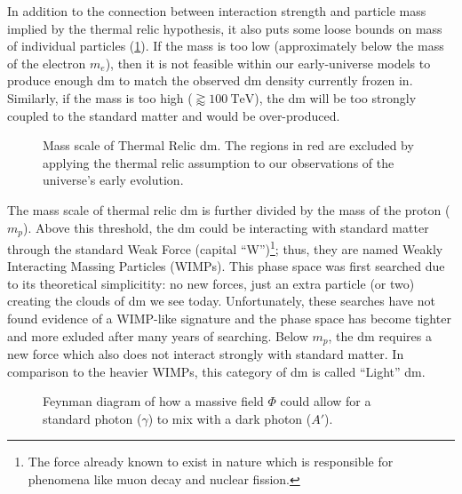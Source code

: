 In addition to the connection between interaction strength and particle mass implied by the thermal
relic hypothesis, it also puts some loose bounds on mass of individual particles
(\cref{fig:dm-mass-scale}). If the mass is too low (approximately below the mass of the electron
$m_e$), then it is not feasible within our early-universe models to produce enough \ac{dm} to
match the observed \ac{dm} density currently frozen in. Similarly, if the mass is too high
($\gtrapprox 100~\text{TeV}$), the \ac{dm} will be too strongly coupled to the standard matter and
would be over-produced. 

\begin{figure}
	\centering
	
	\caption{Mass scale of Thermal Relic \ac{dm}.
		The regions in red are excluded by applying the thermal relic assumption
		to our observations of the universe's early evolution.}
	\label{fig:dm-mass-scale}
\end{figure}

The mass scale of thermal relic \ac{dm} is further divided by the mass of the proton ($m_p$).
Above this threshold, the \ac{dm} could be interacting with standard matter through the standard
Weak Force (capital ``W'')\footnote{ The force already known to exist in nature which is
	responsible for phenomena like muon decay and nuclear fission. }; thus, they are named Weakly
Interacting Massing Particles (WIMPs). This phase space was first searched due to its theoretical
simplicitity: no new forces, just an extra particle (or two) creating the clouds of \ac{dm} we see
today. Unfortunately, these searches have not found evidence of a WIMP-like
signature\cite{supercdms-2018,damic-2020,xenon1t-2018} and the phase space has become tighter and
more exluded after many years of searching. Below $m_p$, the \ac{dm} requires a new force
which also does not interact strongly with standard matter. In comparison to the heavier WIMPs,
this category of \ac{dm} is called ``Light'' \ac{dm}.

\begin{figure}
	\centering
	\caption{Feynman diagram of how a massive field $\Phi$ could allow for a standard photon ($\gamma$)
		to mix with a dark photon ($A'$).}
	\label{fig:photon-mixing}
\end{figure}

